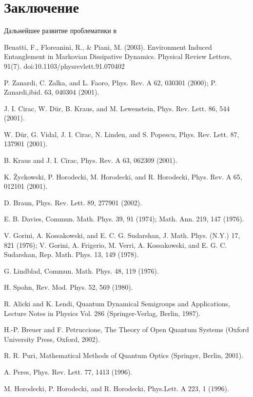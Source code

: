 \documentclass[11pt]{article}
\begin{document}
\section{Заключение}
Дальнейшее развитие проблематики в ~\cite{b21,b22,b23,b24}

\begin{thebibliography}{3}
Benatti, F., Floreanini, R., \& Piani, M. (2003). Environment Induced Entanglement in Markovian Dissipative Dynamics. Physical Review Letters, 91(7). doi:10.1103/physrevlett.91.070402 

P. Zanardi, C. Zalka, and L. Faoro, Phys. Rev. A 62, 030301 (2000); P. Zanardi,ibid. 63, 040304 (2001).

J. I. Cirac, W. Dür, B. Kraus, and M. Lewenstein, Phys. Rev. Lett. 86, 544 (2001).

W. Dür, G. Vidal, J. I. Cirac, N. Linden, and S. Popescu, Phys. Rev. Lett. 87, 137901 (2001).

B. Kraus and J. I. Cirac, Phys. Rev. A 63, 062309 (2001).

K. Życkowski, P. Horodecki, M. Horodecki, and R. Horodecki, Phys. Rev. A 65, 012101 (2001).

D. Braun, Phys. Rev. Lett. 89, 277901 (2002).

E. B. Davies, Commun. Math. Phys. 39, 91 (1974); Math. Ann. 219, 147 (1976).

V. Gorini, A. Kossakowski, and E. C. G. Sudarshan, J. Math. Phys. (N.Y.) 17, 821 (1976); V. Gorini, A. Frigerio, M. Verri, A. Kossakowski, and E. G. C.
Sudarshan, Rep. Math. Phys. 13, 149 (1978).

 G. Lindblad, Commun. Math. Phys. 48, 119 (1976).

 H. Spohn, Rev. Mod. Phys. 52, 569 (1980).

 R. Alicki and K. Lendi, Quantum Dynamical Semigroups and Applications, Lecture Notes in Physics Vol. 286 (Springer-Verlag, Berlin, 1987).

H.-P. Breuer and F. Petruccione, The Theory of Open Quantum Systems (Oxford University Press, Oxford, 2002).

 R. R. Puri, Mathematical Methods of Quantum Optics (Springer, Berlin, 2001).

 A. Peres, Phys. Rev. Lett. 77, 1413 (1996).
 
 M. Horodecki, P. Horodecki, and R. Horodecki, Phys.Lett. A 223, 1 (1996).
 

\end{thebibliography}
\end{document}
